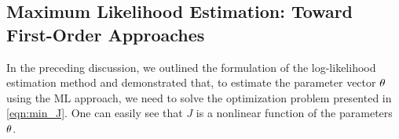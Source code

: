 

\subsection{Maximum Likelihood Estimation: Toward First-Order Approaches}\label{sec:Maximum Likelihood Estimation: Toward first-order approaches}
In the preceding discussion, we outlined the formulation of the log-likelihood estimation method and demonstrated that, to estimate the parameter vector ${ \mathrm{\theta} }$ using the ML approach, we need to solve the optimization problem presented in \eqref{eqn:min_J}. One can easily see that $J$ is a nonlinear function of the parameters ${ \mathrm{\theta} }$. 
